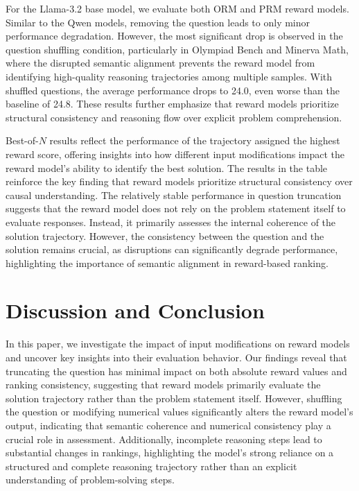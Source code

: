 \documentclass{article}
\begin{document}
For the Llama-3.2 base model, we evaluate both ORM and PRM reward models. Similar to the Qwen models, removing the question leads to only minor performance degradation. However, the most significant drop is observed in the question shuffling condition, particularly in Olympiad Bench and Minerva Math, where the disrupted semantic alignment prevents the reward model from identifying high-quality reasoning trajectories among multiple samples. With shuffled questions, the average performance drops to 24.0, even worse than the baseline of 24.8. These results further emphasize that reward models prioritize structural consistency and reasoning flow over explicit problem comprehension.

Best-of-$N$ results reflect the performance of the trajectory assigned the highest reward score, offering insights into how different input modifications impact the reward model’s ability to identify the best solution. The results in the table reinforce the key finding that reward models prioritize structural consistency over causal understanding. The relatively stable performance in question truncation suggests that the reward model does not rely on the problem statement itself to evaluate responses. Instead, it primarily assesses the internal coherence of the solution trajectory. However, the consistency between the question and the solution remains crucial, as disruptions can significantly degrade performance, highlighting the importance of semantic alignment in reward-based ranking.

\section{Discussion and Conclusion}
In this paper, we investigate the impact of input modifications on reward models and uncover key insights into their evaluation behavior. Our findings reveal that truncating the question has minimal impact on both absolute reward values and ranking consistency, suggesting that reward models primarily evaluate the solution trajectory rather than the problem statement itself. However, shuffling the question or modifying numerical values significantly alters the reward model’s output, indicating that semantic coherence and numerical consistency play a crucial role in assessment. Additionally, incomplete reasoning steps lead to substantial changes in rankings, highlighting the model’s strong reliance on a structured and complete reasoning trajectory rather than an explicit understanding of problem-solving steps.
\end{document}
